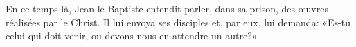 En ce temps-là, Jean le Baptiste entendit parler, dans sa prison,
		des œuvres réalisées par le Christ.
Il lui envoya ses disciples et, par eux, lui demanda:
	«Es-tu celui qui doit venir, ou devons-nous en attendre un autre?»

